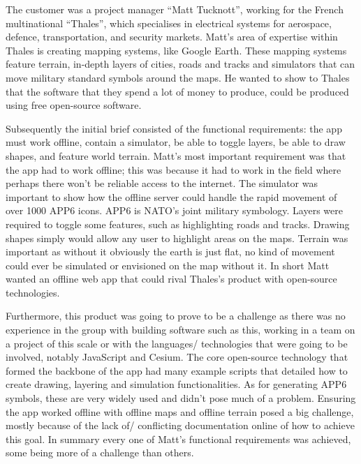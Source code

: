 \documentclass{l3proj}
\begin{document}
The customer was a project manager “Matt Tucknott”,  working for the French multinational “Thales”, which specialises in electrical systems for aerospace, defence, transportation, and security markets.  Matt’s area of expertise within Thales is creating mapping systems, like Google Earth.  These mapping systems feature terrain, in-depth layers of cities, roads and tracks and simulators that can move military standard symbols around the maps. He wanted to show to Thales that the software that they spend a lot of money to produce, could be produced using free open-source software.\par
Subsequently the initial brief consisted of the functional requirements: the app must work offline, contain a simulator, be able to toggle layers, be able to draw shapes, and feature world terrain.  Matt's most important requirement was that the app had to work offline; this was because it had to work in the field where perhaps there won’t be reliable access to the internet.  The simulator was important to show how the offline server could handle the rapid movement of over 1000 APP6 icons.  APP6 is NATO's joint military symbology.  Layers were required to toggle some features, such as highlighting roads and tracks.  Drawing shapes simply would allow any user to highlight areas on the maps.  Terrain was important as without it obviously the earth is just flat, no kind of movement could ever be simulated or envisioned on the map without it.  In short Matt wanted an offline web app that could rival Thales’s product with open-source technologies. \par
Furthermore, this product was going to prove to be a challenge as there was no experience in the group with building software such as this, working in a team on a project of this scale or with the languages/ technologies that were going to be involved, notably JavaScript and Cesium.  The core open-source technology that formed the backbone of the app had many example scripts that detailed how to create drawing, layering and simulation functionalities.  As for generating APP6 symbols, these are very widely used and didn't pose much of a problem.  Ensuring the app worked offline with offline maps and offline terrain posed a big challenge, mostly because of the lack of/ conflicting documentation online of how to achieve this goal.  In summary every one of Matt's functional requirements was achieved, some being more of a challenge than others.\par
\end{document}

